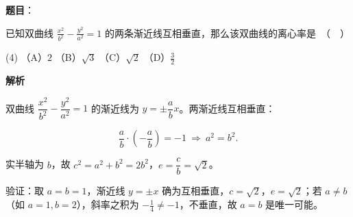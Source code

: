 \begin{answer}

\textbf{题目}：

已知双曲线 $\frac{x^2}{b^2} - \frac{y^2}{a^2} = 1$ 的两条渐近线互相垂直，那么该双曲线的离心率是　（　）

\begin{gkopts}(4)
\task （A）$2$
\task （B）$\sqrt{3}$
\task （C）$\sqrt{2}$
\task （D）$\frac{3}{2}$
\end{gkopts}

\textbf{解析}

双曲线 $\dfrac{x^2}{b^2}-\dfrac{y^2}{a^2}=1$ 的渐近线为 $y=\pm\dfrac{a}{b}x$。两渐近线互相垂直：

\nopagebreak[4]
\[\frac{a}{b}\cdot\left(-\frac{a}{b}\right)=-1\ \Longrightarrow\ a^2=b^2 .\]

实半轴为 $b$，故 $c^2=a^2+b^2=2b^2$，$e=\dfrac{c}{b}=\sqrt2$。

验证：取 $a=b=1$，渐近线 $y=\pm x$ 确为互相垂直，$c=\sqrt2$，$e=\sqrt2$；若 $a\ne b$（如 $a=1,b=2$），斜率之积为 $-\tfrac14\ne-1$，不垂直，故 $a=b$ 是唯一可能。


\par\medskip

\end{answer}
